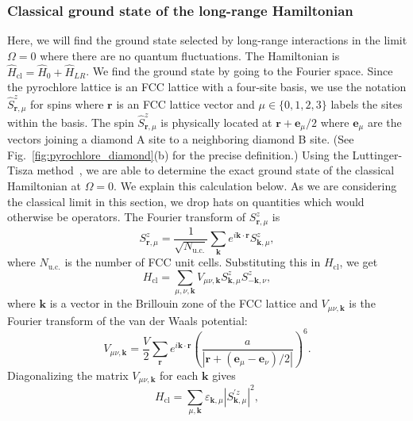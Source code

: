 \documentclass[twocolumn,superscriptaddress,amsmath,amssymb,aps,prx,nofootinbib]{revtex4-2}
\begin{document}
\subsubsection{Classical ground state of the long-range Hamiltonian}\label{sec:classical}

Here, we will find the ground state selected by long-range interactions in the limit $\Omega = 0$ where there are no quantum fluctuations. The Hamiltonian is $\hat{H}_{\text{cl}} = \hat{H}_0 +  \hat{H}_{LR}$. We find the ground state by going to the Fourier space. Since the pyrochlore lattice is an FCC lattice with a four-site basis, we use the notation $\hat{S}^z_{\mathbf{r},\mu}$ for spins where $\mathbf{r}$ is an FCC lattice vector and $\mu \in \{ 0, 1,2,3 \}$ labels the sites within the basis. The spin $\hat{S}^z_{\mathbf{r},\mu}$ is physically located at $\mathbf{r} + \mathbf{e}_\mu/2$ where $\mathbf{e}_\mu$ are the vectors joining a diamond A site to a neighboring diamond B site. (See Fig.~\ref{fig:pyrochlore_diamond}(b) for the precise definition.)
Using the Luttinger-Tisza method~\cite{luttinger1946theory, lyons1960method,litvin1974luttinger}, we are able to determine the exact ground state of the classical Hamiltonian at $\Omega=0$. We explain this calculation below.
As we are considering the classical limit in this section, we drop hats on quantities which would otherwise be operators. The Fourier transform of $S_{\mathbf{r},\mu}^z$ is
\begin{equation}
  S^z_{\mathbf{r},\mu} = \frac{1}{\sqrt{N_{\text{u.c.}}}} \sum_{\mathbf{k}} e^{i \mathbf{k} \cdot \mathbf{r}}S^z_{\mathbf{k},\mu},
\end{equation}
where $N_{\text{u.c.}}$ is the number of FCC unit cells. Substituting this in $H_{\text{cl}}$, we get 
\begin{equation}
  H_{\text{cl} } = \sum_{\mu,\nu,\mathbf{k}} V_{\mu\nu,\mathbf{k}} S^z_{\mathbf{k},\mu} S^z_{-\mathbf{k},\nu},
\end{equation}
where $\mathbf{k}$ is a vector in the Brillouin zone of the FCC lattice and $V_{\mu\nu,\mathbf{k}}$ is the Fourier transform of the van der Waals potential:
\begin{equation} \label{eq:vlr_ft}
V_{\mu\nu,\mathbf{k}} = \frac{V}{2 } \sum_{\mathbf{r}} e^{i \mathbf{k}\cdot \mathbf{r}} \left( \frac{a}{|\mathbf{r} + (\mathbf{e}_\mu - \mathbf{e}_\nu)/2 |} \right)^6.
\end{equation}
Diagonalizing the matrix $V_{\mu\nu,\mathbf{k}}$ for each $\mathbf{k}$ gives
\begin{equation} \label{eq:H_Omega_0_fourier}
  H_\text{cl} = \sum_{\mu, \mathbf{k}} \varepsilon_{\mathbf{k},\mu} |S^{'z}_{\mathbf{k},\mu}|^2,
\end{equation}
\end{document}
